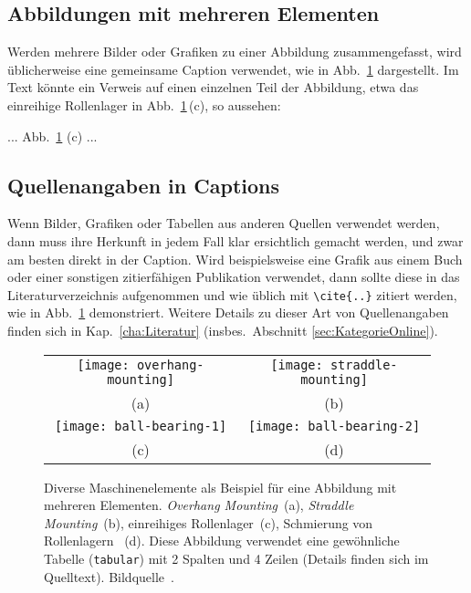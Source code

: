 \subsection{Abbildungen mit mehreren Elementen}

Werden mehrere Bilder oder Grafiken zu einer Abbildung zusammengefasst, wird
üblicherweise eine gemeinsame Caption verwendet, wie in Abb.~\ref{fig:Bearings}
dargestellt. Im Text könnte ein Verweis auf einen einzelnen Teil der
Abbildung, etwa das einreihige Rollenlager in Abb.~\ref{fig:Bearings}\,(c),
so aussehen:
%
\begin{LaTeXCode}[numbers=none]
    ... Abb.~\ref{fig:Bearings} (c) ... 
\end{LaTeXCode}


\subsection{Quellenangaben in Captions}
\label{sec:QuellenangabenInCaptions}

Wenn Bilder, Grafiken oder Tabellen aus anderen Quellen verwendet werden,
dann muss ihre Herkunft in jedem Fall klar ersichtlich gemacht werden, und
zwar am besten direkt in der Caption. Wird beispielsweise eine Grafik aus
einem Buch oder einer sonstigen zitierfähigen Publikation verwendet, dann
sollte diese in das Literaturverzeichnis aufgenommen und wie üblich mit
\verb!\cite{..}! zitiert werden, wie in Abb.\ \ref{fig:Bearings} demonstriert.
Weitere Details zu dieser Art von Quellenangaben finden sich in Kap.\
\ref{cha:Literatur} (insbes.\ Abschnitt \ref{sec:KategorieOnline}).

\begin{figure}
	\centering\small
	\begin{tabular}{@{}c@{\hspace{12mm}}c@{}} %
		\texttt{[image: overhang-mounting]} &
		\texttt{[image: straddle-mounting]}
		\\
		(a) & (b)
		\\[4pt]    %
		\texttt{[image: ball-bearing-1]} &
		\texttt{[image: ball-bearing-2]}
		\\
		(c) & (d)
	\end{tabular}
%
	\caption{Diverse Maschinenelemente als Beispiel für eine Abbildung mit
	mehreren Elementen. \emph{Overhang Mounting}~(a), \emph{Straddle
	Mounting}~(b), einreihiges Rollenlager~(c), Schmierung von Rollenlagern~
	(d). Diese Abbildung verwendet eine gewöhnliche Tabelle
	(\texttt{tabular}) mit 2 Spalten und 4 Zeilen (Details finden sich im
	Quelltext). Bildquelle~\cite{Faires1934}.}
	\label{fig:Bearings}
\end{figure}


